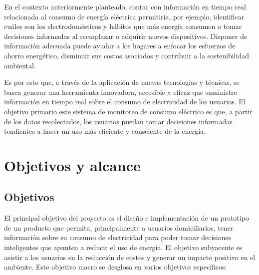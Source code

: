 En el contexto anteriormente planteado, contar con información en tiempo real relacionada al consumo de energía eléctrica permitiría, por ejemplo, identificar cuáles son los electrodomésticos y hábitos que más energía consumen o tomar decisiones informadas al reemplazar o adquirir nuevos dispositivos. Disponer de información adecuada puede ayudar a los hogares a enfocar los esfuerzos de ahorro energético, disminuir sus costos asociados y contribuir a la sostenibilidad ambiental.

Es por esto que, a través de la aplicación de nuevas tecnologías y técnicas, se busca generar una herramienta innovadora, accesible y eficaz que suministre información en tiempo real sobre el consumo de electricidad de los usuarios. El objetivo primario este sistema de monitoreo de consumo eléctrico es que, a partir de los datos recolectados, los usuarios puedan tomar decisiones informadas tendientes a hacer un uso más eficiente y consciente de la energía.

\newpage
\section{Objetivos y alcance}

\subsection{Objetivos}
El principal objetivo del proyecto es el diseño e implementación de un prototipo de un producto que permita, principalmente a usuarios domiciliarios, tener información sobre su consumo de electricidad para poder tomar decisiones inteligentes que apunten a reducir el uso de energía. El objetivo subyacente es asistir a los usuarios en la reducción de costos y generar un impacto positivo en el ambiente. Este objetivo macro se desglosa en varios objetivos específicos:

